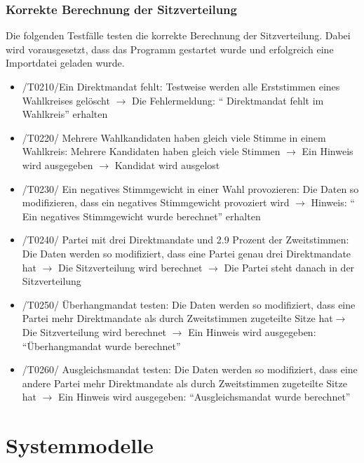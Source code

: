 \documentclass[10pt,a4paper]{article}
\begin{document}
\subsubsection{Korrekte Berechnung der Sitzverteilung}
Die folgenden Testfälle testen die korrekte Berechnung der Sitzverteilung. Dabei wird vorausgesetzt, dass  das Programm gestartet wurde und erfolgreich eine Importdatei geladen wurde.
\begin{itemize}
	\item /T0210/Ein Direktmandat fehlt: \newline
	Testweise werden alle Erststimmen eines Wahlkreises gelöscht $\rightarrow$ Die Fehlermeldung: `` Direktmandat fehlt im Wahlkreis'' erhalten
	\item /T0220/ Mehrere Wahlkandidaten haben gleich viele Stimme in einem Wahlkreis: \newline
	Mehrere Kandidaten haben gleich viele Stimmen $\rightarrow$ Ein Hinweis wird ausgegeben $\rightarrow$ Kandidat wird ausgelost
	\item /T0230/ Ein negatives Stimmgewicht in einer Wahl provozieren:\newline
	Die Daten so modifizieren, dass ein negatives Stimmgewicht provoziert wird $\rightarrow$ Hinweis: `` Ein negatives Stimmgewicht wurde berechnet'' erhalten
	\item /T0240/ Partei mit drei Direktmandate und 2.9 Prozent der Zweitstimmen: \newline
	Die Daten werden so modifiziert, dass eine Partei genau drei Direktmandate hat $\rightarrow$ Die Sitzverteilung wird berechnet $\rightarrow$ Die Partei steht danach in der Sitzverteilung
	\item /T0250/ Überhangmandat testen: \newline
	Die Daten werden so modifiziert, dass eine Partei mehr Direktmandate als durch Zweitstimmen zugeteilte Sitze hat$\rightarrow$ Die Sitzverteilung wird berechnet $\rightarrow$ Ein Hinweis wird ausgegeben: ``Überhangmandat wurde berechnet''
	\item /T0260/ Ausgleichsmandat testen: \newline
	Die Daten werden so modifiziert, dass eine andere Partei mehr Direktmandate als durch Zweitstimmen zugeteilte Sitze hat $\rightarrow$ Ein Hinweis wird ausgegeben: ``Ausgleichsmandat wurde berechnet''
\end{itemize}


\section{Systemmodelle}
\end{document}
